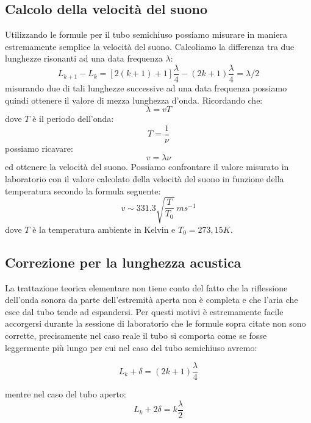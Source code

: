\documentclass[a4paper,10pt,oneside]{article}
\begin{document}
\subsection{Calcolo della velocità del suono}
Utilizzando le formule per il tubo semichiuso possiamo misurare in maniera estremamente semplice la velocità del suono. Calcoliamo la differenza tra due lunghezze risonanti ad una data frequenza $\lambda$:
\begin{equation}
 L_{k+1}-L_k=[2(k+1)+1]\frac{\lambda}{4}-(2k+1)\frac{\lambda}{4}=\lambda/2
\end{equation}
misurando due di tali lunghezze successive ad una data frequenza possiamo quindi ottenere il valore di mezza lunghezza d'onda.
Ricordando che:
\begin{equation}
 \lambda=vT
\end{equation}
dove $T$ è il periodo dell'onda:
\begin{equation}
 T=\frac{1}{\nu}
\end{equation}
possiamo ricavare:
\begin{equation}
 v=\lambda\nu
\end{equation}
ed ottenere la velocità del suono. Possiamo confrontare il valore misurato in laboratorio con il valore calcolato della velocità del suono in funzione della temperatura secondo la formula seguente:
\begin{equation}
 v\sim 331.3\sqrt{\frac{T}{T_0}}\ ms^{-1}
\end{equation}
dove $T$ è la temperatura ambiente in Kelvin e $T_0=273,15K$.
 

\subsection{Correzione per la lunghezza acustica}

La trattazione teorica elementare non tiene conto del fatto che la riflessione dell'onda sonora da parte dell'estremità aperta non è completa e che l'aria che esce dal tubo tende ad espandersi. Per questi motivi è estremamente facile accorgersi durante la sessione di laboratorio che le formule sopra citate non sono corrette, precisamente nel caso reale il tubo si comporta come se fosse leggermente più lungo per cui nel caso del tubo semichiuso avremo:


\begin{equation}
 L_k+\delta=(2k+1)\frac{\lambda}{4}
\end{equation}

mentre nel caso del tubo aperto:
\begin{equation}
 L_k+2\delta=k\frac{\lambda}{2}
\end{equation}
\end{document}
